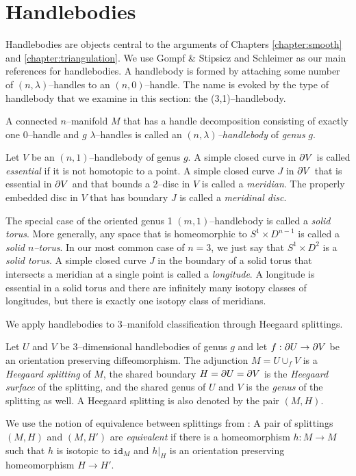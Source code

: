 \section{Handlebodies}
\label{section:problem-handlebodies}

Handlebodies are objects central to the arguments of Chapters \ref{chapter:smooth} and \ref{chapter:triangulation}.
We use Gompf \& Stipsicz \cite{GompStip} and Schleimer \cite{SchlWald} as our main references for handlebodies.
A handlebody is formed by attaching some number of $(n,\lambda)$--handles to an $(n,0)$--handle.
The name is evoked by the type of handlebody that we examine in this section: the (3,1)--handlebody.

\begin{defn}
	A connected $n$--manifold $M$ that has a handle decomposition consisting of exactly one 0--handle and $g$ $\lambda$--handles is called an \emph{$(n,\lambda)$--handlebody} of \emph{genus} $g$.
	
	Let $V$ be an $(n,1)$--handlebody of genus $g$.
	A simple closed curve in $\partial V$ is called \emph{essential} if it is not homotopic to a point.
	A simple closed curve $J$ in $\partial V$ that is essential in $\partial V$ and that bounds a 2--disc in $V$ is called a \emph{meridian}.
	The properly embedded disc in $V$ that has boundary $J$ is called a \emph{meridinal disc}.
	
	The special case of the oriented genus 1 $(m,1)$--handlebody is called a \emph{solid torus}.
	More generally, any space that is homeomorphic to $S^1\times D^{n-1}$ is called a \emph{solid $n$--torus}.
	In our most common case of $n=3$, we just say that $S^1\times D^2$ is a \emph{solid torus}.
	A simple closed curve $J$ in the boundary of a solid torus that intersects a meridian at a single point is called a \emph{longitude}.
	A longitude is essential in a solid torus and there are infinitely many isotopy classes of longitudes, but there is exactly one isotopy class of meridians.
\end{defn}

We apply handlebodies to 3--manifold classification through Heegaard splittings.

\begin{defn}	
	Let $U$ and $V$ be 3--dimensional handlebodies of genus $g$ and let $f:\partial U\to \partial V$ be an orientation preserving diffeomorphism.
	The adjunction $M=U\cup_f V$ is a \emph{Heegaard splitting} of $M$, the shared boundary $H = \partial U = \partial V$ is the \emph{Heegaard surface} of the splitting, and the shared genus of $U$ and $V$ is the \emph{genus} of the splitting as well.
	A Heegaard splitting is also denoted by the pair $(M,H)$.
	
	We use the notion of equivalence between splittings from \cite{SchlWald}:
	A pair of splittings $(M,H)$ and $(M,H')$ are \emph{equivalent} if there is a homeomorphism $h:M\to M$ such that $h$ is isotopic to $\texttt{id}_M$ and $h|_H$ is an orientation preserving homeomorphism $H\to H'$.
\end{defn}

